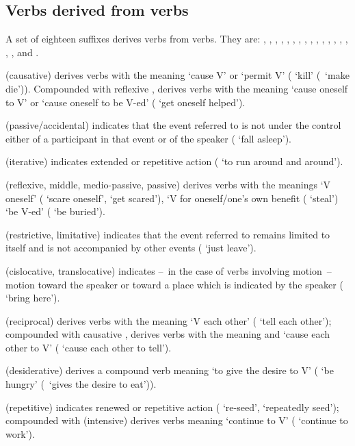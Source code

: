 \subsection{Verbs derived from verbs}\label{VDfV}
A set of eighteen suffixes derives verbs from verbs. They are: , , , , , , , , , , , , , , , , , and . 

 (causative) derives verbs with the meaning ‘cause V’ or ‘permit V’ ( ‘kill’ (\lit~‘make die’)). Compounded with reflexive ,  derives verbs with the meaning ‘cause oneself to V’ or ‘cause oneself to be V-ed’ ( ‘get oneself helped’). 

 (passive/accidental) indicates that the event referred to is not under the control either of a participant in that event or of the speaker ( ‘fall asleep’).

 (iterative) indicates extended or repetitive action ( ‘to run around and around’).

 (reflexive, middle, medio-passive, passive) derives verbs with the meanings ‘V oneself’ ( ‘scare oneself’, ‘get scared’), ‘V for oneself/one’s own benefit ( ‘steal’) ‘be V-ed’ ( ‘be buried’). 

 (restrictive, limitative) indicates that the event referred to remains limited to itself and is not accompanied by other events ( ‘just leave’). 

 (cislocative, translocative) indicates --~in the case of verbs involving motion~-- motion toward the speaker or toward a place which is indicated by the speaker ( ‘bring here’).

 (reciprocal) derives verbs with the meaning ‘V each other’ ( ‘tell each other’); compounded with causative ,  derives verbs with the meaning and ‘cause each other to V’ ( ‘cause each other to tell’).

 (desiderative) derives a compound verb meaning ‘to give the desire to V’ ( ‘be hungry’ (\lit~‘gives the desire to eat’)).

 (repetitive) indicates renewed or repetitive action ( ‘re-seed’, ‘repeatedly seed’); compounded with  (intensive)  derives verbs meaning ‘continue to V’ ( ‘continue to work’).

